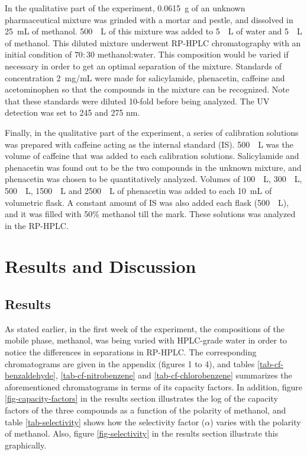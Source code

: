\documentclass[a4paper, 12pt]{article}
\begin{document}
In the qualitative part of the experiment, \SI{0.0615}{g} of an unknown pharmaceutical mixture was grinded with a mortar and pestle, and dissolved in \SI{25}{mL} of methanol. \SI{500}{\mu{}L} of this mixture was added to \SI{5}{\mu{}L} of water and \SI{5}{\mu{}L} of methanol. This diluted mixture underwent RP-HPLC chromatography with an initial condition of $70:30$ methanol:water. This composition would be varied if necessary in order to get an optimal separation of the mixture. Standards of concentration \SI{2}{mg/mL} were made for salicylamide, phenacetin, caffeine and acetominophen so that the compounds in the mixture can be recognized. Note that these standards were diluted \num{10}-fold before being analyzed. The UV detection was set to \num{245} and \num{275} \si{nm}.

Finally, in the qualitative part of the experiment, a series of calibration solutions was prepared with caffeine acting as the internal standard (IS). \SI{500}{\mu{}L} was the volume of caffeine that was added to each calibration solutions. Salicylamide and phenacetin was found out to be the two compounds in the unknown mixture, and phenacetin was chosen to be quantitatively analyzed. Volumes of \SI{100}{\mu{}L}, \SI{300}{\mu{}L}, \SI{500}{\mu{}L}, \SI{1500}{\mu{}L} and \SI{2500}{\mu{}L} of phenacetin was added to each \SI{10}{mL} of volumetric flask. A constant amount of IS was also added each flask (\SI{500}{\mu{}L}), and it was filled with 50\% methanol till the mark. These solutions was analyzed in the RP-HPLC.


\section{Results and Discussion}

\subsection{Results}
As stated earlier, in the first week of the experiment, the compositions of the mobile phase, methanol, was being varied with HPLC-grade water in order to notice the differences in separations in RP-HPLC. The corresponding chromatograms are given in the appendix (figures 1 to 4), and tables \ref{tab-cf-benzaldehyde}, \ref{tab-cf-nitrobenzene} and \ref{tab-cf-chlorobenzene} summarizes the aforementioned chromatograms in terms of its capacity factors. In addition, figure \ref{fig-capacity-factors} in the results section illustrates the log of the capacity factors of the three compounds as a function of the polarity of methanol, and table \ref{tab-selectivity} shows how the selectivity factor ($\alpha$) varies with the polarity of methanol. Also, figure \ref{fig-selectivity} in the results section illustrate this graphically.
\end{document}
